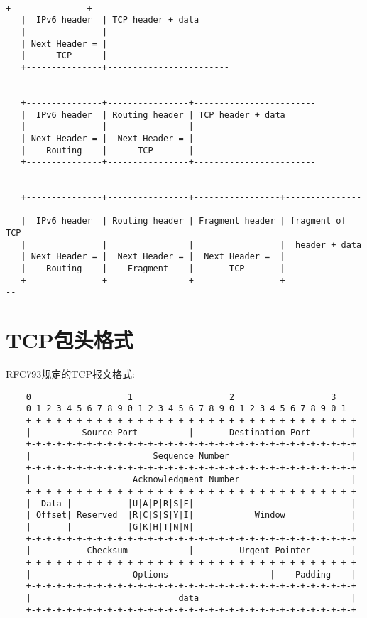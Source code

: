 \begin{center}
    \begin{lstlisting}

+---------------+------------------------
   |  IPv6 header  | TCP header + data
   |               |
   | Next Header = |
   |      TCP      |
   +---------------+------------------------


   +---------------+----------------+------------------------
   |  IPv6 header  | Routing header | TCP header + data
   |               |                |
   | Next Header = |  Next Header = |
   |    Routing    |      TCP       |
   +---------------+----------------+------------------------


   +---------------+----------------+-----------------+-----------------
   |  IPv6 header  | Routing header | Fragment header | fragment of TCP
   |               |                |                 |  header + data
   | Next Header = |  Next Header = |  Next Header =  |
   |    Routing    |    Fragment    |       TCP       |
   +---------------+----------------+-----------------+-----------------

    \end{lstlisting}
\end{center}


\section{TCP包头格式}
RFC793规定的TCP报文格式:
\begin{lstlisting}
    0                   1                   2                   3
    0 1 2 3 4 5 6 7 8 9 0 1 2 3 4 5 6 7 8 9 0 1 2 3 4 5 6 7 8 9 0 1
    +-+-+-+-+-+-+-+-+-+-+-+-+-+-+-+-+-+-+-+-+-+-+-+-+-+-+-+-+-+-+-+-+
    |          Source Port          |       Destination Port        |
    +-+-+-+-+-+-+-+-+-+-+-+-+-+-+-+-+-+-+-+-+-+-+-+-+-+-+-+-+-+-+-+-+
    |                        Sequence Number                        |
    +-+-+-+-+-+-+-+-+-+-+-+-+-+-+-+-+-+-+-+-+-+-+-+-+-+-+-+-+-+-+-+-+
    |                    Acknowledgment Number                      |
    +-+-+-+-+-+-+-+-+-+-+-+-+-+-+-+-+-+-+-+-+-+-+-+-+-+-+-+-+-+-+-+-+
    |  Data |           |U|A|P|R|S|F|                               |
    | Offset| Reserved  |R|C|S|S|Y|I|            Window             |
    |       |           |G|K|H|T|N|N|                               |
    +-+-+-+-+-+-+-+-+-+-+-+-+-+-+-+-+-+-+-+-+-+-+-+-+-+-+-+-+-+-+-+-+
    |           Checksum            |         Urgent Pointer        |
    +-+-+-+-+-+-+-+-+-+-+-+-+-+-+-+-+-+-+-+-+-+-+-+-+-+-+-+-+-+-+-+-+
    |                    Options                    |    Padding    |
    +-+-+-+-+-+-+-+-+-+-+-+-+-+-+-+-+-+-+-+-+-+-+-+-+-+-+-+-+-+-+-+-+
    |                             data                              |
    +-+-+-+-+-+-+-+-+-+-+-+-+-+-+-+-+-+-+-+-+-+-+-+-+-+-+-+-+-+-+-+-+
\end{lstlisting}

